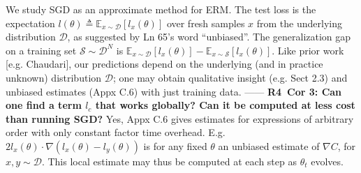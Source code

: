 \documentclass{article}
\newcommand{\Rd}{\textmd{\textsf{\color{purple} {R4}}}}
\newcommand{\sct}[1]{\textmd{\textsf{Sect #1}}}
\newcommand{\cor}[1]{\textmd{\textsf{Cor #1}}}
\newcommand{\pdx}[1]{\textmd{\textsf{Appx #1}}}
\newcommand{\lin}[1]{\textmd{\textsf{Ln #1}}}
\begin{document}
    We study SGD as an approximate method for ERM.  The test loss is the
    expectation $l(\theta) \triangleq
    \mathbb{E}_{x\sim\mathcal{D}}[l_x(\theta)]$ over fresh samples $x$ from the
    underlying distribution $\mathcal{D}$, as suggested by \lin{65}'s word
    ``unbiased''.  The generalization gap on a training set $\mathcal{S}\sim
    \mathcal{D}^N$ is $\mathbb{E}_{x\sim\mathcal{D}}[l_x(\theta)] -
    \mathbb{E}_{x\sim\mathcal{S}}[l_x(\theta)]$.
    Like prior work [e.g. Chaudari], our predictions depend on the underlying
    (and in practice unknown) distribution $\mathcal{D}$; one may obtain
    qualitative insight (e.g. \sct{2.3}) and unbiased estimates (\pdx{C.6})
    with just training data.
    ------
    \textbf{\Rd\ \cor{3}: Can one find a term $l_c$ that works globally? Can it
    be computed at less cost than running SGD?}
    Yes, \pdx{C.6} gives estimates for expressions of arbitrary order with only
    constant factor time overhead.  E.g.
    $2l_x(\theta)\cdot\nabla(l_x(\theta)-l_y(\theta))$ is for any fixed $\theta$
    an unbiased estimate of $\nabla C$, for $x,y\sim \mathcal{D}$.  This local
    estimate may thus be computed at each step as $\theta_t$ evolves.
\end{document}
